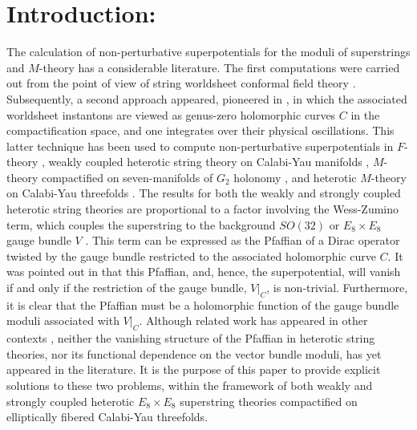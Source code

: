 \documentclass[a4paper,12pt]{article}
\numberwithin{equation}{section}
\theoremstyle{plain}
\begin{document}
\section{Introduction:}

The calculation of non-perturbative superpotentials for the moduli of
superstrings and $M$-theory has a considerable literature. The first
computations
were
carried out from the point of view of string worldsheet conformal field
theory \cite{DSWW1,DSWW2}.
Subsequently, a second approach appeared, pioneered in \cite{Witten1,
BBS},
in which
the associated worldsheet instantons are viewed as genus-zero holomorphic
curves $C$ in the compactification space, and one integrates over their
physical oscillations. This latter technique has been used to compute
non-perturbative superpotentials in $F$-theory \cite{DGW},
weakly coupled heterotic string theory on
Calabi-Yau manifolds \cite{Witten2}, $M$-theory compactified on
seven-manifolds of $G_{2}$
holonomy \cite{HM},
and heterotic $M$-theory on
Calabi-Yau threefolds
\cite{Lima1,Lima2}.
The results for
both the weakly and strongly coupled heterotic string theories are
proportional to a factor involving the Wess-Zumino term, which couples the
superstring to the background $SO(32)$ or $E_{8} \times E_{8}$
gauge bundle $V$
\cite{Witten2,Lima1,Lima2}.
This term can be expressed as the Pfaffian of a Dirac operator twisted by
the gauge bundle restricted to the associated holomorphic curve $C$.
It was pointed out in \cite{Witten2} that this Pfaffian, and, hence,
the superpotential,
will vanish if and only if the restriction of the gauge bundle,
$V|_{C}$, is non-trivial. Furthermore, it is clear that the Pfaffian
must be a holomorphic function of the gauge bundle moduli associated with
$V|_{C}$. Although related work has appeared in other contexts \cite{DGW},
neither the vanishing structure of the Pfaffian in heterotic string
theories,
nor its functional dependence on the vector bundle moduli, has yet
appeared in
the literature. It is the purpose of this paper to provide explicit
solutions
to these two problems, within the framework of both weakly and strongly
coupled
heterotic $E_{8} \times E_{8}$ superstring theories compactified on
elliptically fibered Calabi-Yau threefolds.
\end{document}
